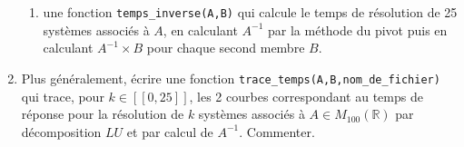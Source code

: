 \begin{enumerate}
\begin{enumerate}
		\item une fonction \texttt{temps\_inverse(A,B)} qui calcule le temps de résolution de 25 systèmes associés à $A$, en calculant $A^{-1}$ par la méthode du pivot puis en calculant $A^{-1}\times B$ pour chaque second membre $B$.
		
	\end{enumerate}
	
	\item Plus généralement, écrire une fonction \texttt{trace\_temps(A,B,nom\_de\_fichier) } qui trace, pour $k\in [\![0,25]\!]$, les 2 courbes correspondant au temps de réponse pour la résolution de $k$ systèmes associés à $A\in M_{100}(\mathbb{R})$ par décomposition $LU$ et par calcul de $A^{-1}$. Commenter.
	
\end{enumerate}